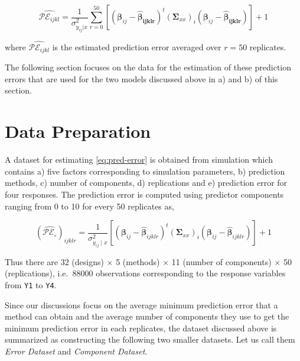 \documentclass[review]{elsarticle}
\begin{document}
\begin{equation}
\widehat{\mathcal{PE}_{ijkl}} = \frac{1}{\sigma_{y_{ij}|x}^2}
  \sum_{r=0}^{50}{\left[\left(\boldsymbol{\beta}_{ij} -
  \boldsymbol{\hat{\beta}_{ijklr}}\right)^t
  \left(\boldsymbol{\Sigma}_{xx}\right)_i
  \left(\boldsymbol{\beta}_{ij} - \boldsymbol{\hat{\beta}_{ijklr}}\right)\right]} + 1
\label{eq:estimated-pred-error}
\end{equation}

where \(\widehat{\mathcal{PE}_{ijkl}}\) is the estimated prediction
error averaged over \(r=50\) replicates.

The following section focuses on the data for the estimation of these
prediction errors that are used for the two models discussed above in a)
and b) of this section.

\section{Data Preparation}\label{data-preparation}

A dataset for estimating \eqref{eq:pred-error} is obtained from simulation
which contains a) five factors corresponding to simulation parameters,
b) prediction methods, c) number of components, d) replications and e)
prediction error for four responses. The prediction error is computed
using predictor components ranging from 0 to 10 for every 50 replicates
as,

\begin{equation*}
\left(\widehat{\mathcal{PE_\circ}}\right)_{ijklr} =
  \frac{1}{\sigma_{y_{ij}\mid x}^2}\left[
    \left(\boldsymbol{\beta}_{ij} - \hat{\boldsymbol{\beta}}_{ijklr}\right)^t
    \left(\boldsymbol{\Sigma}_{xx}\right)_{i}
    \left(\boldsymbol{\beta}_{ij} - \hat{\boldsymbol{\beta}}_{ijklr}\right)
  \right] + 1
\end{equation*}

Thus there are 32 (designs) \(\times\) 5 (methods) \(\times\) 11 (number
of components) \(\times\) 50 (replications), i.e.~88000 observations
corresponding to the response variables from \texttt{Y1} to \texttt{Y4}.

Since our discussions focus on the average minimum prediction error that
a method can obtain and the average number of components they use to get
the minimum prediction error in each replicates, the dataset discussed
above is summarized as constructing the following two smaller datasets.
Let us call them \emph{Error Dataset} and \emph{Component Dataset}.
\end{document}
